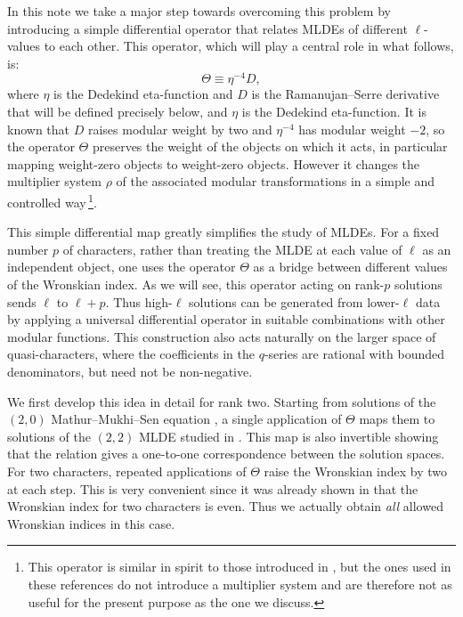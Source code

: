 \documentclass[11pt]{article}
\newcommand\be{\begin{equation}}
\newcommand\ee{\end{equation}}
\begin{document}
In this note we take a major step towards overcoming this problem by introducing a simple differential operator that relates MLDEs of different $\ell$-values to each other. This operator, which will play a central role in what follows, is:
\be\label{eq:sc_op}
        \Theta \equiv \eta^{-4}D ,
\ee
where \(\eta\) is the Dedekind eta-function and \(D\) is the Ramanujan--Serre derivative that will be defined precisely below, and $\eta$ is the Dedekind eta-function. It is known that $D$ raises modular weight by two and \(\eta^{-4}\) has modular weight \(-2\), so the operator \(\Theta\) preserves the weight of the objects on which it acts, in particular mapping weight-zero objects to weight-zero objects. However it changes the multiplier system $\rho$ of the associated modular transformations in a simple and controlled way\,\footnote{This operator is similar in spirit to those introduced in \cite{Bantay:2010uy, nagatomo2022MLDE}, but the ones used in these references do not introduce a multiplier system and are therefore not as useful for the present purpose as the one we discuss.}. 

This simple differential map greatly simplifies the study of MLDEs. For a fixed number $p$ of characters, rather than treating the MLDE at each value of \(\ell\) as an independent object, one uses the operator \(\Theta\) as a bridge between different values of the Wronskian index. As we will see, this operator acting on rank-$p$ solutions sends $\ell$ to $\ell+p$. Thus high-\(\ell\) solutions can be generated from lower-\(\ell\) data by applying a universal differential operator in suitable combinations with other modular functions. This construction also acts naturally on the larger space of quasi-characters, where the coefficients in the \(q\)-series are rational with bounded denominators, but need not be non-negative.

We first develop this idea in detail for rank two. Starting from solutions of the \((2,0)\) Mathur--Mukhi--Sen equation \cite{Mathur:1988na, Mathur:1988gt}, a single application of \(\Theta\) maps them to solutions of the \((2,2)\) MLDE studied in \cite{Naculich:1988xv, Hampapura:2015cea, Gaberdiel:2016zke}. This map is also invertible showing that the relation gives a one-to-one correspondence between the solution spaces. For two characters, repeated applications of \(\Theta\) raise the Wronskian index by two at each step. This is very convenient since it was already shown in \cite{Naculich:1988xv} that the Wronskian index for two characters is even. Thus we actually obtain {\em all} allowed Wronskian indices in this case.
\end{document}
